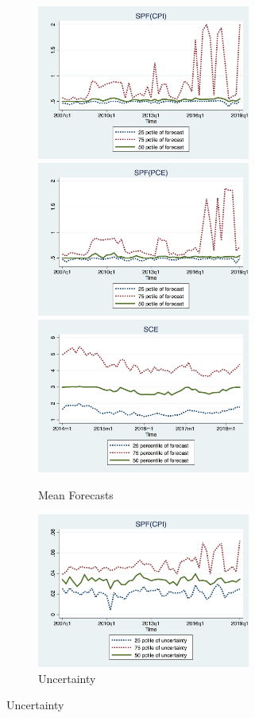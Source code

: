 \documentclass[12pt]{article}
\begin{document}
	
	\begin{figure}[p]
		\begin{subfigure}[b]{0.5\textwidth}
		\centering
		\caption{Mean Forecasts}
		\includegraphics[width=7cm]{figures/IQRmeanCPIQ.png} 
		\smallskip
		\includegraphics[width=7cm]{figures/IQRmeanPCEQ.png}
		\smallskip
		\includegraphics[width=7cm]{figures/IQRmeanSCEM.png}
		\end{subfigure}
	    \hfill 
		\begin{subfigure}[b]{0.5\textwidth}
		\centering 
		\caption{Uncertainty}
		\includegraphics[width=7cm]{figures/IQRvarCPIQ.png}

\end{subfigure}
\end{figure}
\end{document}
